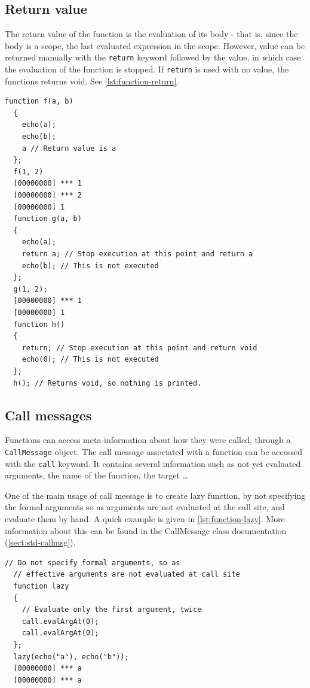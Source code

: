 \documentclass[openright,twoside,12pt]{report}
\newcommand   {\floatpos}          {htbp}
\newcommand{\lst}[1]{\autoref{lst:#1}}
\newcommand{\sect}[1]{\autoref{sect:#1}}
\begin{document}
\subsection{Return value}

The return value of the function is the evaluation of its body - that
is, since the body is a scope, the last evaluated expression in the
scope. However, value can be returned manually with the
\lstinline|return| keyword followed by the value, in which case the
evaluation of the function is stopped. If \lstinline|return| is used
with no value, the functions returns void. See \lst{function-return}.

\begin{lstlisting}[caption=Returning values from functions,
  label=lst:function-return,float=\floatpos]
  function f(a, b)
  {
    echo(a);
    echo(b);
    a // Return value is a
  };
  f(1, 2)
  [00000000] *** 1
  [00000000] *** 2
  [00000000] 1
  function g(a, b)
  {
    echo(a);
    return a; // Stop execution at this point and return a
    echo(b); // This is not executed
  };
  g(1, 2);
  [00000000] *** 1
  [00000000] 1
  function h()
  {
    return; // Stop execution at this point and return void
    echo(0); // This is not executed
  };
  h(); // Returns void, so nothing is printed.
\end{lstlisting}

\subsection{Call messages}
\label{sect:us-fun-callmsg}

Functions can access meta-information about how they were called,
through a \lstinline|CallMessage| object. The call message associated
with a function can be accessed with the \lstinline|call| keyword. It
contains several information such as not-yet evaluated arguments, the
name of the function, the target \ldots

One of the main usage of call message is to create lazy function, by
not specifying the formal arguments so as arguments are not evaluated
at the call site, and evaluate them by hand. A quick example is given
in \lst{function-lazy}. More information about this can be found in
the CallMessage class documentation (\sect{std-callmsg}).

\begin{lstlisting}[caption=Lazy
  function,label=lst:function-lazy,float=\floatpos]
  // Do not specify formal arguments, so as
  // effective arguments are not evaluated at call site
  function lazy
  {
    // Evaluate only the first argument, twice
    call.evalArgAt(0);
    call.evalArgAt(0);
  };
  lazy(echo("a"), echo("b"));
  [00000000] *** a
  [00000000] *** a
\end{lstlisting}
\end{document}
